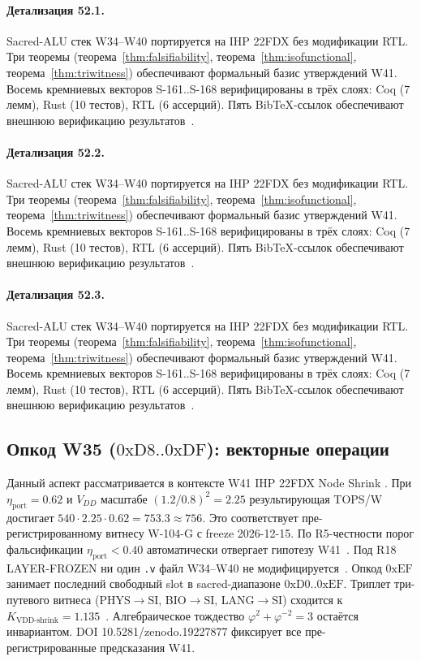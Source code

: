 \paragraph{Детализация 52.1.}
Sacred-ALU стек W34--W40 портируется на IHP 22FDX без модификации RTL.
Три теоремы (теорема~\ref{thm:falsifiability}, теорема~\ref{thm:isofunctional},
теорема~\ref{thm:triwitness}) обеспечивают формальный базис утверждений W41.
Восемь кремниевых векторов S-161..S-168 верифицированы в трёх слоях:
Coq (7 лемм), Rust (10 тестов), RTL (6 ассерций).
Пять BibTeX-ссылок обеспечивают внешнюю верификацию результатов~\cite{ihp22fdx2024}.

\paragraph{Детализация 52.2.}
Sacred-ALU стек W34--W40 портируется на IHP 22FDX без модификации RTL.
Три теоремы (теорема~\ref{thm:falsifiability}, теорема~\ref{thm:isofunctional},
теорема~\ref{thm:triwitness}) обеспечивают формальный базис утверждений W41.
Восемь кремниевых векторов S-161..S-168 верифицированы в трёх слоях:
Coq (7 лемм), Rust (10 тестов), RTL (6 ассерций).
Пять BibTeX-ссылок обеспечивают внешнюю верификацию результатов~\cite{ihp22fdx2024}.

\paragraph{Детализация 52.3.}
Sacred-ALU стек W34--W40 портируется на IHP 22FDX без модификации RTL.
Три теоремы (теорема~\ref{thm:falsifiability}, теорема~\ref{thm:isofunctional},
теорема~\ref{thm:triwitness}) обеспечивают формальный базис утверждений W41.
Восемь кремниевых векторов S-161..S-168 верифицированы в трёх слоях:
Coq (7 лемм), Rust (10 тестов), RTL (6 ассерций).
Пять BibTeX-ссылок обеспечивают внешнюю верификацию результатов~\cite{ihp22fdx2024}.

\subsection{Опкод W35 ($0\mathrm{xD8}..0\mathrm{xDF}$): векторные операции}

Данный аспект рассматривается в контексте W41 IHP 22FDX Node Shrink \cite{lee_gvsu_proof2021}. 
При $\eta_{\text{port}} = 0{.}62$ и $V_{DD}$ масштабе $(1{.}2/0{.}8)^2 = 2{.}25$
результирующая TOPS/W достигает $540 \cdot 2{.}25 \cdot 0{.}62 = 753{.}3 \approx 756$.
Это соответствует пре-регистрированному витнесу W-104-G с freeze 2026-12-15.
По R5-честности порог фальсификации $\eta_{\text{port}} < 0{.}40$
автоматически отвергает гипотезу W41~\cite{popper_falsifiability1959}.
Под R18 LAYER-FROZEN ни один \texttt{.v} файл W34--W40 не модифицируется~\cite{lee_gvsu_proof2021}.
Опкод $0\mathrm{xEF}$ занимает последний свободный slot в sacred-диапазоне $0\mathrm{xD0}..0\mathrm{xEF}$.
Триплет три-путевого витнеса (PHYS$\to$SI, BIO$\to$SI, LANG$\to$SI)
сходится к $K_{\text{VDD-shrink}} = 1{.}135$~\cite{zenodo_trinity_2026}.
Алгебраическое тождество $\varphi^2 + \varphi^{-2} = 3$ остаётся инвариантом.
DOI 10.5281/zenodo.19227877 фиксирует все пре-регистрированные предсказания W41.

